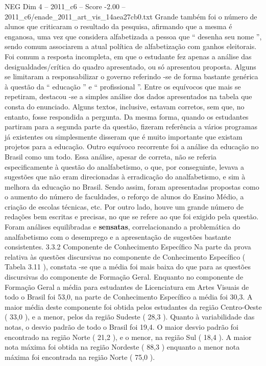 \begin{textsample}{NEG Dim 4 – 2011\_c6 – Score -2.00 – 2011\_c6/enade\_2011\_art\_vis\_14aea27cb0.txt}
Grande também foi o número de alunos que criticaram o resultado da pesquisa, afirmando que a mesma é enganosa, uma vez que considera alfabetizada a pessoa que “ desenha seu nome ”, sendo comum associarem a atual política de alfabetização com ganhos eleitorais.
Foi comum a resposta incompleta, em que o estudante fez apenas a análise das desigualdades/crítica do quadro apresentado, ou só apresentou proposta.
Alguns se limitaram a responsabilizar o governo referindo -se de forma bastante genérica à questão da “ educação ” e “ profissional ”.
Entre os equívocos que mais se repetiram, destacou -se a simples análise dos dados apresentados na tabela que consta do enunciado.
Alguns textos, inclusive, estavam corretos, sem que, no entanto, fosse respondida a pergunta.
Da mesma forma, quando os estudantes partiram para a segunda parte da questão, fizeram referência a vários programas já existentes ou simplesmente disseram que é muito importante que existam projetos para a educação.
Outro equívoco recorrente foi a análise da educação no Brasil como um todo.
Essa análise, apesar de correta, não se referia especificamente à questão do analfabetismo, o que, por conseguinte, levava a sugestões que não eram direcionadas à erradicação do analfabetismo, e sim à melhora da educação no Brasil.
Sendo assim, foram apresentadas propostas como o aumento do número de faculdades, o reforço de alunos do Ensino Médio, a criação de escolas técnicas, etc.
Por outro lado, houve um grande número de redações bem escritas e precisas, no que se refere ao que foi exigido pela questão.
Foram análises equilibradas e \textbf{sensatas}, correlacionando a problemática do analfabetismo com o desemprego e a apresentação de sugestões bastante consistentes. 3.3.2 Componente de Conhecimento Específico Na parte da prova relativa às questões discursivas no componente de Conhecimento Específico ( Tabela 3.11 ), constata -se que a média foi mais baixa do que para as questões discursivas do componente de Formação Geral.
Enquanto no componente de Formação Geral a média para estudantes de Licenciatura em Artes Visuais de todo o Brasil foi 53,0, na parte de Conhecimento Específico a média foi 30,3.
A maior média deste componente foi obtida pelos estudantes da região Centro-Oeste ( 33,0 ), e a menor, pelos da região Sudeste ( 28,3 ).
Quanto à variabilidade das notas, o desvio padrão de todo o Brasil foi 19,4.
O maior desvio padrão foi encontrado na região Norte ( 21,2 ), e o menor, na região Sul ( 18,4 ).
A maior nota máxima foi obtida na região Nordeste ( 88,3 ) enquanto a menor nota máxima foi encontrada na região Norte ( 75,0 ).

\end{textsample}
